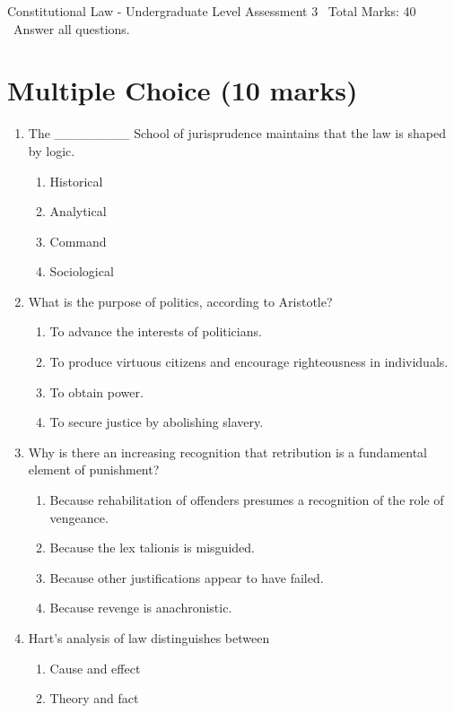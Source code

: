 \documentclass[12pt]{article}
\begin{document}
\begin{center}
Constitutional Law - Undergraduate Level Assessment 3 \
Total Marks: 40 \
Answer all questions.
\end{center}

\section*{Multiple Choice (10 marks)}
\begin{enumerate}[label=\arabic*.]
\item The \_\_\_\_\_\_\_\_ School of jurisprudence maintains that the law is shaped by logic.
\begin{enumerate}[label=(\alph*)]
    \item Historical
    \item Analytical
    \item Command
    \item Sociological
\end{enumerate}
\item What is the purpose of politics, according to Aristotle?
\begin{enumerate}[label=(\alph*)]
    \item To advance the interests of politicians.
    \item To produce virtuous citizens and encourage righteousness in individuals.
    \item To obtain power.
    \item To secure justice by abolishing slavery.
\end{enumerate}
\item Why is there an increasing recognition that retribution is a fundamental element of punishment?
\begin{enumerate}[label=(\alph*)]
    \item Because rehabilitation of offenders presumes a recognition of the role of vengeance.
    \item Because the lex talionis is misguided.
    \item Because other justifications appear to have failed.
    \item Because revenge is anachronistic.
\end{enumerate}
\item Hart's analysis of law distinguishes between
\begin{enumerate}[label=(\alph*)]
    \item Cause and effect
    \item Theory and fact

\end{enumerate}
\end{enumerate}
\end{document}
